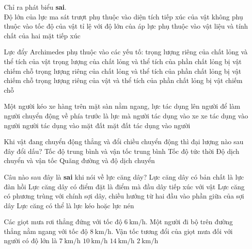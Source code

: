 \begin{ex}
Chỉ ra phát biểu \textbf{sai}.\\
Độ lớn của lực ma sát trượt	
	\choice
	{\True phụ thuộc vào diện tích tiếp xúc của vật}
	{không phụ thuộc vào tốc độ của vật}
	{tỉ lệ với độ lớn của áp lực}
	{phụ thuộc vào vật liệu và tính chất của hai mặt tiếp xúc}
	\loigiai{}
\end{ex}
\begin{ex}
	Lực đẩy Archimedes phụ thuộc vào các yếu tố:
	\choice
	{trọng lượng riêng của chất lỏng và thể tích của vật}
	{trọng lượng của chất lỏng và thể tích của phần chất lỏng bị vật chiếm chỗ}
	{\True trọng lượng riêng của chất lỏng và thể tích của phần chất lỏng bị vật chiếm chỗ}
	{trọng lượng riêng của vật và thể tích của phần chất lỏng bị vật chiếm chỗ}
	\loigiai{}
\end{ex}
\begin{ex}
	Một người kéo xe hàng trên mặt sàn nằm ngang, lực tác dụng lên người để làm người chuyển động về phía trước là lực mà
	\choice
	{người tác dụng vào xe}
	{xe tác dụng vào người}
	{người tác dụng vào mặt đất}
	{\True mặt đất tác dụng vào người}
	\loigiai{}
\end{ex}
\begin{ex}
Khi vật đang chuyển động thẳng và đổi chiều chuyển động thì đại lượng nào sau đây đổi dấu?	
	\choice
	{Tốc độ trung bình và vận tốc trung bình}
	{Tốc độ tức thời}
	{\True Độ dịch chuyển và vận tốc}
	{Quãng đường và độ dịch chuyển}
	\loigiai{}
\end{ex}
\begin{ex}
	Câu nào sau đây là \textbf{sai} khi nói về lực căng dây?
	\choice
	{Lực căng dây có bản chất là lực đàn hồi}
	{Lực căng dây có điểm đặt là điểm mà đầu dây tiếp xúc với vật}
	{Lực căng có phương trùng với chính sợi dây, chiều hướng từ hai đầu vào phần giữa của sợi dây}
	{\True Lực căng có thể là lực kéo hoặc lực nén}
	\loigiai{}
\end{ex}
\begin{ex}
	Các giọt mưa rơi thẳng đứng với tốc độ $\SI{6}{\kilo\meter/\hour}$. Một người đi bộ trên đường thẳng nằm ngang với tốc độ $\SI{8}{\kilo\meter/\hour}$. Vận tốc tương đổi của giọt mưa đối với người có độ lớn là
	\choice
	{$\SI{7}{\kilo\meter/\hour}$}
	{\True $\SI{10}{\kilo\meter/\hour}$}
	{$\SI{14}{\kilo\meter/\hour}$}
	{$\SI{2}{\kilo\meter/\hour}$}
	\loigiai{}
\end{ex}
